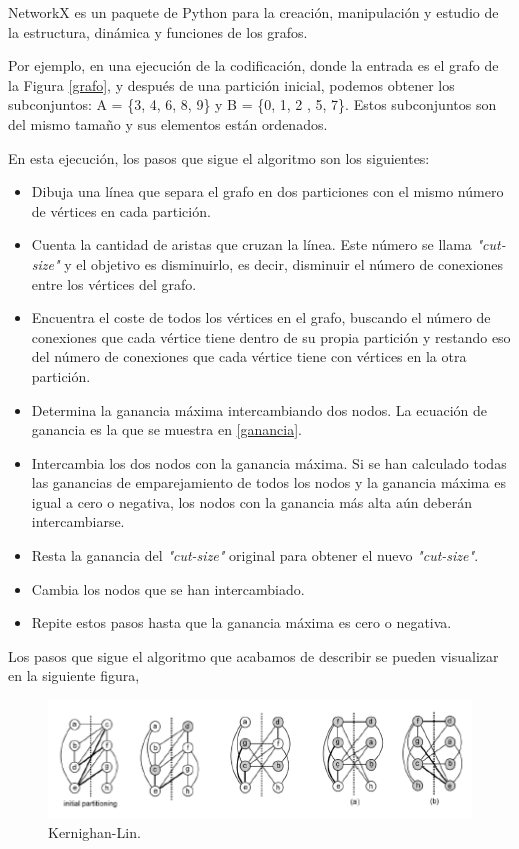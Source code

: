 \begin{mydef}\label{NetworkX}
	NetworkX es un paquete de Python para la creación, manipulación y estudio de la estructura, dinámica y funciones de los grafos. 
\end{mydef}

Por ejemplo, en una ejecución de la codificación, donde la entrada es el grafo de la Figura \ref{grafo}, y después de una partición inicial, podemos obtener los subconjuntos: A = \{3, 4, 6, 8, 9\} y B = \{0, 1, 2 , 5, 7\}. Estos subconjuntos son del mismo tamaño y sus elementos están ordenados.

En esta ejecución, los pasos que sigue el algoritmo son los siguientes:

\begin{itemize}
	\item Dibuja una línea que separa el grafo en dos particiones con el mismo número de vértices en cada partición.
	\item Cuenta la cantidad de aristas que cruzan la línea. Este número se llama \textit{"cut-size"} y el objetivo es disminuirlo, es decir, disminuir el número de conexiones entre los vértices del grafo.
	\item Encuentra el coste de todos los vértices en el grafo, buscando el número de conexiones que cada vértice tiene dentro de su propia partición y restando eso del número de conexiones que cada vértice tiene con vértices en la otra partición.
	\item Determina la ganancia máxima intercambiando dos nodos. La ecuación de ganancia es la que se muestra en \ref{ganancia}.
	\item Intercambia los dos nodos con la ganancia máxima. Si se han calculado todas las ganancias de emparejamiento de todos los nodos y la ganancia máxima es igual a cero o negativa, los nodos con la ganancia más alta aún deberán intercambiarse.
	\item Resta la ganancia del \textit{"cut-size"} original para obtener el nuevo \textit{"cut-size"}.
	\item Cambia los nodos que se han intercambiado.
	\item Repite estos pasos hasta que la ganancia máxima es cero o negativa.
\end{itemize}

\newpage
Los pasos que sigue el algoritmo que acabamos de describir se pueden visualizar en la siguiente figura,

\begin{figure}[h]
	\centering
	\includegraphics[scale=0.9]{Figures/KL_steps}
	\vspace{1mm}
	\caption{Kernighan-Lin.}
	\label{KL_steps}
\end{figure}

